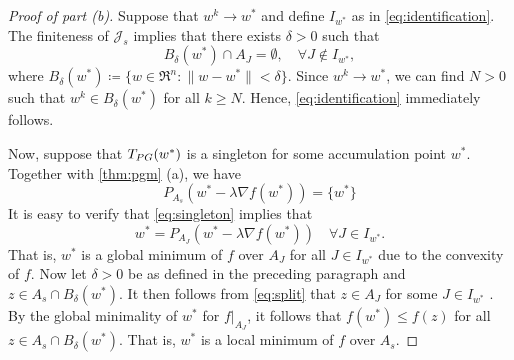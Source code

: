 \documentclass{article}
\theoremstyle{plain}
\theoremstyle{definition}
\theoremstyle{remark}
\newcommand{\J}{\mathcal{J}}
\newcommand{\jh}[1]{\footnote{\textbf{JH:} #1}}
\begin{document}
\begin{proof}[Proof of part (b)]
	Suppose that $w^k \to w^*$ and define $I_{w^*}$ as in 
	\cref{eq:identification}. The finiteness of $\J_s$ 
	implies that there exists $\delta>0$ such that
	\begin{equation}
		B_{\delta}(w^*)\cap A_J = \emptyset,\quad \forall J\notin
		I_{w^*},
		\label{eq:split}
	\end{equation}
	where $B_{\delta}(w^*) \coloneqq \{ 
	w\in \Re^n : \|w-w^*\| < \delta\}$. Since $w^k\to w^*$, we can find $N>0$ 
	such that $w^k \in B_{\delta}(w^*)$ for all $k\geq N$. Hence, 
	\cref{eq:identification} immediately follows. 
	
	Now, suppose that $T_{\rm PG}(w^*)$ is a singleton for some accumulation 
	point $w^*$. Together with \cref{thm:pgm} (a), we have 
	\begin{equation}
	\label{eq:singleton}
	P_{A_s} (w^* - 
	\lambda \nabla f(w^*)) = \{w^*\}
	\end{equation}
	It is easy to verify that \cref{eq:singleton} implies that 
	\begin{equation}
	\label{eq:singleton2}
	w^* = 
	P_{A_J}(w^*-\lambda \nabla f(w^*)) \quad \forall J\in I_{w^*}.
	\end{equation}
	That is, $w^*$ 
	is a global minimum of $f$ over $A_J$ for all $J\in I_{w^*}$ due
	to the convexity of $f$.
	Now let $\delta>0$ be as defined in the preceding paragraph and $z\in A_s  
	\cap B_{\delta}(w^*)$. It then follows from \cref{eq:split} that
	$z\in A_J$ for some $J\in I_{w^*}$ .
	By the global minimality of $w^*$ for $f|_{A_J}$, it follows that
	$f(w^*)\leq f(z)$ for all $z\in A_s \cap B_{\delta}(w^*)$. That
	is, $w^*$ is a local minimum of $f$ over $A_s$.  
	

\end{proof}
\end{document}
